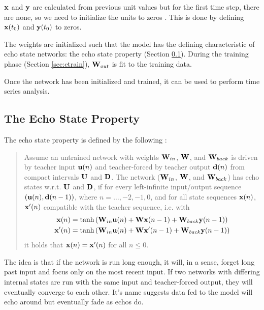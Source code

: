 \documentclass{article}
\begin{document}
$\mathbf{x}$ and $\mathbf{y}$ are calculated from previous unit values but for the first
time step, there are none, so we need to initialize the units to zeros
\cite{jaeger2002tutorial}. This is done by defining $\mathbf{x}(t_0)$ and $\mathbf{y}(t_0)$
to zeros.

The weights are initialized such that the model has the defining
characteristic of echo state networks: the echo state property (Section
\ref{sec:eprop}). During the training phase (Section \ref{sec:etrain}),
$\mathbf{W}_{out}$ is fit to the training data.

Once the network has been initialized and trained, it can be used to perform
time series analysis.

\subsection{The Echo State Property}
\label{sec:eprop}

The echo state property is defined by the following
\cite{jaeger2002tutorial}:

\begin{quote}
    Assume an untrained network with weights $\mathbf{W}_{in}$, $\mathbf{W}$, and $\mathbf{W}_{back}$ is
    driven by teacher input $\mathbf{u}(n)$ and teacher-forced by teacher output
    $\mathbf{d}(n)$ from compact intervals $\mathbf{U}$ and $\mathbf{D}$. The network ($\mathbf{W}_{in}$,
    $\mathbf{W}$, and $\mathbf{W}_{back}$) has echo states w.r.t. $\mathbf{U}$ and $\mathbf{D}$, if for every
    left-infinite input/output sequence $(\mathbf{u}(n), \mathbf{d}(n-1))$, where $n=\dots,
    -2, -1, 0$, and for all state sequences $\mathbf{x}(n)$, $\mathbf{x}'(n)$ compatible
    with the teacher sequence, i.e. with
    \begin{align}
        \mathbf{x}(n) &= \tanh \left(
                \mathbf{W}_{in} \mathbf{u}(n)
                + \mathbf{W} \mathbf{x}(n-1)
                + \mathbf{W}_{back} \mathbf{y}(n-1)
            \right) \\
        \mathbf{x}'(n) &= \tanh \left(
                \mathbf{W}_{in} \mathbf{u}(n)
                + \mathbf{W} \mathbf{x}'(n-1)
                + \mathbf{W}_{back} \mathbf{y}(n-1)
            \right)
    \end{align}
    it holds that $\mathbf{x}(n) = \mathbf{x}'(n)$ for all $n \leq 0$.
\end{quote}

The idea is that if the network is run long enough, it will, in a sense,
forget long past input and focus only on the most recent input. If two
networks with differing internal states are run with the same input and
teacher-forced output, they will eventually converge to each other. It's name
suggests data fed to the model will echo around but eventually fade as echos
do.
\end{document}
